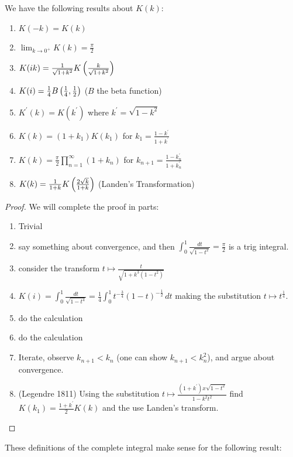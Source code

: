 \documentclass{article}
\begin{document}
\begin{prop}
	We have the following results about $K(k)$:
	\begin{enumerate}
		\item $K(-k) = K(k)$
		\item $\lim_{k \to 0^+} K(k) = \frac{\pi}{2}$
		\item $K(ik) = \frac{1}{\sqrt{1+k^2}}K\left( \frac{k}{\sqrt{1+k^2}} \right)$
		\item $K(i) = \frac{1}{4}B\left( \frac{1}{4},\frac{1}{2} \right)$ ($B$ the beta function)
		\item $K^\prime(k) = K(k^\prime)$ where $k^\prime = \sqrt{1-k^2}$
		\item $K(k) = (1+k_1) K(k_1)$ for $k_1 = \frac{1-k^\prime}{1+k^\prime}$
		\item $K(k) = \frac{\pi}{2} \prod_{n=1}^\infty (1+k_n)$ for $k_{n+1} = \frac{1-k_n^\prime}{1+k_n^\prime}$
		\item 	$K(k)  = \frac{1}{1+k} K \left( \frac{2\sqrt{k}}{1+k} \right)$ (Landen's Transformation)
	\end{enumerate}
\end{prop}
\begin{proof}
	We will complete the proof in parts:
\begin{enumerate}
	\item Trivial 
	\item say something about convergence, and then $\int_0^1 \frac{dt}{\sqrt{1-t^2}} = \frac{\pi}{2}$ is a trig integral. 
	\item  consider the transform $	t \mapsto \frac{t}{\sqrt{1+k^3(1-t^2)}}$
	\item $K(i) = \int_0^1 \frac{dt}{\sqrt{1-t^4}} = \frac{1}{4} \int_0^1 t^{-\frac{3}{4}}(1-t)^{-\frac{1}{2}} \, dt$ making the substitution $t\mapsto t^\frac{1}{4}$.
	\item do the calculation
	\item do the calculation
	\item Iterate, observe $k_{n+1} < k_n$ (one can show $k_{n+1}<k_n^2$), and argue about convergence. 
	\item (Legendre 1811) Using the substitution $t \mapsto \frac{(1+k^\prime)x\sqrt{1-t^2}}{1-k^2 t^2}$ find $K(k_1) = \frac{1+k^\prime}{2}K(k)$ and the use Landen's transform.  
\end{enumerate}
\end{proof}


These definitions of the complete integral make sense for the following result:
\end{document}
